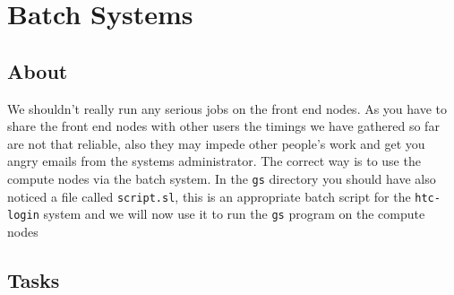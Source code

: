 \documentclass[a4paper, 12pt]{article}
\def \cc   {\tt }               %
\begin{document}

\section{Batch Systems}
\label{heat}

\subsection*{About}
We shouldn't really run any serious jobs on the front end nodes. As you have to share the front end nodes with
other users the timings we have gathered so far are not that reliable, also they may impede other people's work and get you angry emails from the systems administrator.
The correct way is to use the compute nodes via
the batch system. In the {\cc gs} directory you should have also noticed a file called {\cc script.sl}, this is an appropriate
batch script for the {\cc htc-login} system and we will now use it to run the {\cc gs} program on the compute nodes

\subsection*{Tasks}
\end{document}
